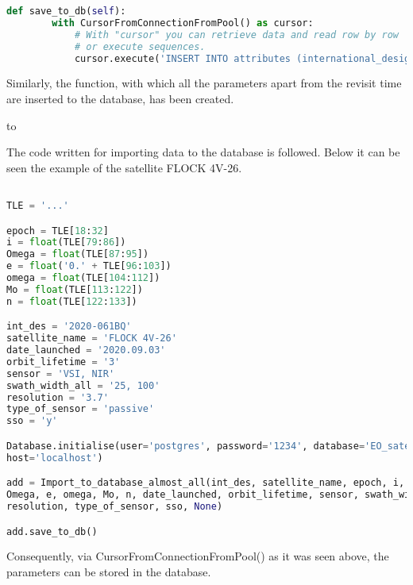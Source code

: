 \documentclass[12pt,a4paper,notitlepage,oneside,openright]{report}
\begin{document}
\begin{center}
\begin{lstlisting}[language=Python, formfeed=\newpage, extendedchars=true]
    def save_to_db(self):
        with CursorFromConnectionFromPool() as cursor:
            # With "cursor" you can retrieve data and read row by row
            # or execute sequences.
            cursor.execute('INSERT INTO attributes (international_designator,&\newline&name, epoch, inclination, raan, eccentricity, omega, mean_anomaly,&\newline&mean_motion, date_launched, orbit_lifetime, sensors, swath_width,&\newline&resolution, revisit_time, type_of_sensor) VALUES&\newline&(%s,%s,%s,%s,%s,%s,%s,%s,%s,%s,%s,%s,%s,%s,%s,%s)',&\newline&            (self.int_des, self.satellite_name, self.epoch, self.i, self.Omega,&\newline&            self.e, self.omega, self.Mo, self.n, self.date_launched,&\newline&            self.orbit_lifetime, self.sensor, self.swath_width, self.resolution,&\newline&            self.median_zerolat, self.type_of_sensor))
\end{lstlisting}
\end{center}

Similarly, the function, with which all the parameters apart from the revisit time are inserted to the database, has been created.

\def\dashfill{\cleaders\hbox{-}\hfill}
\hbox to \hsize{\dashfill\hfil}

The code written for importing data to the database is followed. Below it can be seen the example of the satellite FLOCK 4V-26.
\begin{center}
\begin{lstlisting}[language=Python, formfeed=\newpage, extendedchars=true]

TLE = '...'

epoch = TLE[18:32]
i = float(TLE[79:86])
Omega = float(TLE[87:95])
e = float('0.' + TLE[96:103])
omega = float(TLE[104:112])
Mo = float(TLE[113:122])
n = float(TLE[122:133])

int_des = '2020-061BQ'
satellite_name = 'FLOCK 4V-26'
date_launched = '2020.09.03'
orbit_lifetime = '3'
sensor = 'VSI, NIR'
swath_width_all = '25, 100'
resolution = '3.7'
type_of_sensor = 'passive'
sso = 'y'

Database.initialise(user='postgres', password='1234', database='EO_satellites',
host='localhost')

add = Import_to_database_almost_all(int_des, satellite_name, epoch, i,
Omega, e, omega, Mo, n, date_launched, orbit_lifetime, sensor, swath_width_all,
resolution, type_of_sensor, sso, None)

add.save_to_db()
\end{lstlisting}
\end{center}

Consequently, via CursorFromConnectionFromPool() as it was seen above, the parameters can be stored in the database.

\end{document}
